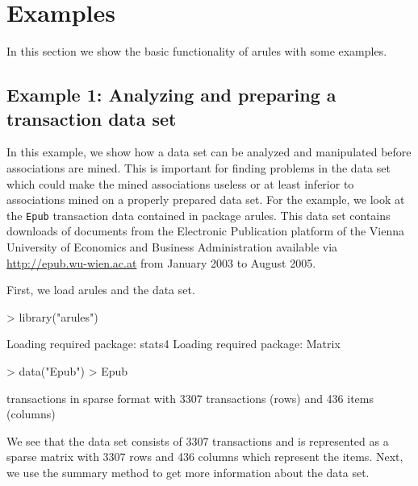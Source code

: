 \documentclass[10pt,a4paper]{article}
\newcommand{\strong}[1]{{\normalfont\fontseries{b}\selectfont #1}}
\newcommand{\code}[1]{\texttt{#1}}
\newcommand{\pkg}[1]{\strong{#1}}
\begin{document}

\section{Examples\label{sec:examples}}
In this section we show the basic functionality of arules with some examples.

\subsection{Example 1: Analyzing and preparing a transaction 
data set \label{sec:example-screen}}

In this example, 
we show how a data set can be analyzed and manipulated
before associations are mined.
This is important for finding problems in the data set which 
could make the mined associations useless or at least inferior
to associations mined on a properly prepared data set.
For the example,
we look at the \code{Epub} transaction data contained in
package \pkg{arules}.  This data set contains downloads of documents
from the Electronic Publication platform of the Vienna University of
Economics and Business Administration available via
\url{http://epub.wu-wien.ac.at} from January 2003 to August 2005.

First, we load \pkg{arules} and the data set.

\begin{Schunk}
\begin{Sinput}
> library("arules")
\end{Sinput}
\begin{Soutput}
Loading required package: stats4
Loading required package: Matrix

\end{Soutput}
\end{Schunk}

\begin{Schunk}
\begin{Sinput}
> data("Epub")
> Epub
\end{Sinput}
\begin{Soutput}
transactions in sparse format with
 3307 transactions (rows) and
 436 items (columns)
\end{Soutput}
\end{Schunk}

We see that the data set consists of 3307 transactions
and is represented as a sparse matrix with 3307 rows
and 436 columns which represent the items. 
Next, we use the summary method to get more information about the 
data set.
\end{document}

